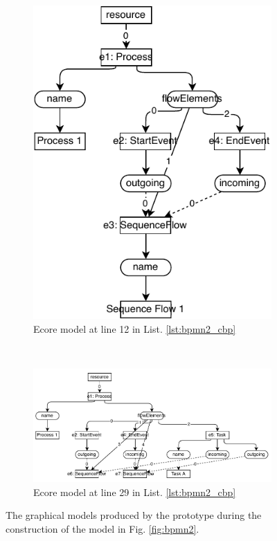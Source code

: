 \documentclass[conference]{IEEEtran}
\begin{document}
\begin{figure}[ht]
\begin{subfigure}[t]{0.48\linewidth}
        \includegraphics[width=\linewidth]{ecore_12}
        \caption{Ecore model at line 12 in List. \ref{lst:bpmn2_cbp}}
        \label{fig:ecore_12}
    \end{subfigure}
    \\
    \begin{subfigure}[t]{\linewidth}
        \centering
        \includegraphics[width=\linewidth]{ecore_32}
        \caption{Ecore model at line 29 in List. \ref{lst:bpmn2_cbp}}
        \label{fig:ecore_29}
    \end{subfigure}
\caption{The graphical models produced by the prototype during the construction of the model in Fig. \ref{fig:bpmn2}.}
\label{fig:prototype}
\end{figure}
\end{document}
